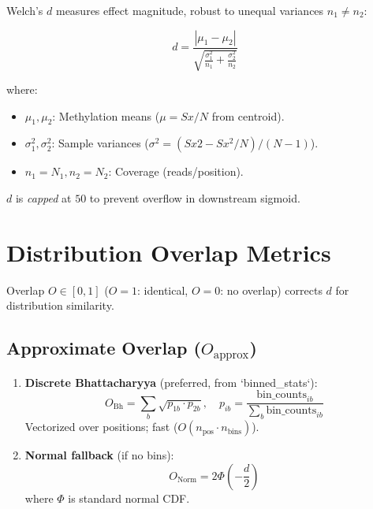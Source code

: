 \documentclass{article}
\begin{document}
Welch's $d$ measures effect magnitude, robust to unequal variances $n_1 \neq n_2$:

\begin{equation}
    d = \frac{|\mu_1 - \mu_2|}{\sqrt{\frac{\sigma_1^2}{n_1} + \frac{\sigma_2^2}{n_2}}}
    \label{eq:welch_d}
\end{equation}

where:
\begin{itemize}
    \item $\mu_1, \mu_2$: Methylation means ($\mu = Sx / N$ from centroid).
    \item $\sigma_1^2, \sigma_2^2$: Sample variances ($\sigma^2 = (Sx2 - Sx^2/N)/(N-1)$).
    \item $n_1 = N_1, n_2 = N_2$: Coverage (reads/position).
\end{itemize}

$d$ is \emph{capped} at $50$ to prevent overflow in downstream sigmoid.

\section{Distribution Overlap Metrics}

Overlap $O \in [0, 1]$ ($O=1$: identical, $O=0$: no overlap) corrects $d$ for distribution similarity.

\subsection{Approximate Overlap ($O_\text{approx}$)}

\begin{enumerate}
    \item \textbf{Discrete Bhattacharyya} (preferred, from `binned\_stats`):
    \begin{equation}
        O_\text{Bh} = \sum_b \sqrt{p_{1b} \cdot p_{2b}}, \quad p_{ib} = \frac{\text{bin\_counts}_{ib}}{\sum_b \text{bin\_counts}_{ib}}
        \label{eq:bhattacharyya}
    \end{equation}
    Vectorized over positions; fast ($O(n_\text{pos} \cdot n_\text{bins})$).

    \item \textbf{Normal fallback} (if no bins):
    \begin{equation}
        O_\text{Norm} = 2 \Phi\left(-\frac{d}{2}\right)
        \label{eq:normal_overlap}
    \end{equation}
    where $\Phi$ is standard normal CDF.
\end{enumerate}
\end{document}
